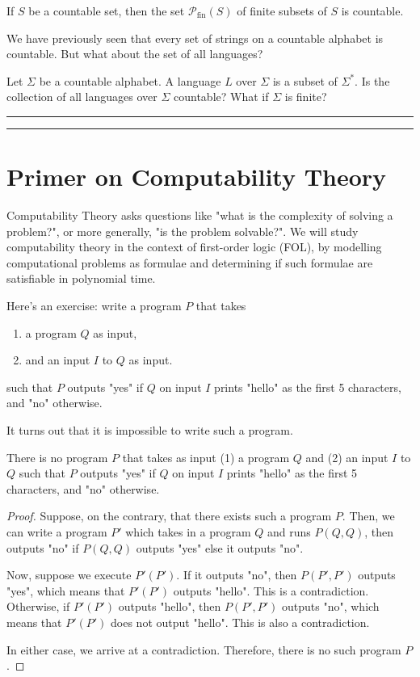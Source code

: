 \documentclass[11pt,usenames, dvipsnames]{article}
\begin{document}
\begin{theorem}
  If $S$ be a countable set, then the set $\mathscr{P}_{\text{fin}}{(S)}$ of finite subsets of $S$ is countable.
\end{theorem}

We have previously seen that every set of strings on a countable alphabet is countable. But what about the set of all languages?

\begin{question}
  Let $\Sigma$ be a countable alphabet. A language $L$ over $\Sigma$ is a subset of $\Sigma^*$. Is the collection of all languages over $\Sigma$ countable? What if $\Sigma$ is finite?
\end{question}

\vspace{5truemm}
\hrule
\hrule

\section{\large \centering Primer on Computability Theory}
\noindent

Computability Theory asks questions like "what is the complexity of solving a problem?", or more generally, "is the problem solvable?". We will study computability theory in the context of first-order logic (FOL), by modelling computational problems as formulae and determining if such formulae are satisfiable in polynomial time.

Here's an exercise: write a program $P$ that takes
\begin{enumerate}
  \item a program $Q$ as input,
  \item and an input $I$ to $Q$ as input.
\end{enumerate}
such that $P$ outputs "yes" if $Q$ on input $I$ prints "hello" as the first 5 characters, and "no" otherwise.

It turns out that it is impossible to write such a program.

\begin{claim}
  There is no program $P$ that takes as input (1) a program $Q$ and (2) an input $I$ to $Q$ such that $P$ outputs "yes" if $Q$ on input $I$ prints "hello" as the first 5 characters, and "no" otherwise.
\end{claim}

\begin{proof}
  Suppose, on the contrary, that there exists such a program $P$. Then, we can write a program $P'$ which takes in a program $Q$ and runs $P(Q, Q)$, then outputs "no" if $P(Q, Q)$ outputs "yes" else it outputs "no".

  Now, suppose we execute $P'(P')$. If it outputs "no", then $P(P', P')$ outputs "yes", which means that $P'(P')$ outputs "hello". This is a contradiction. Otherwise, if $P'(P')$ outputs "hello", then $P(P', P')$ outputs "no", which means that $P'(P')$ does not output "hello". This is also a contradiction.

  In either case, we arrive at a contradiction. Therefore, there is no such program $P$.
\end{proof}
\end{document}
